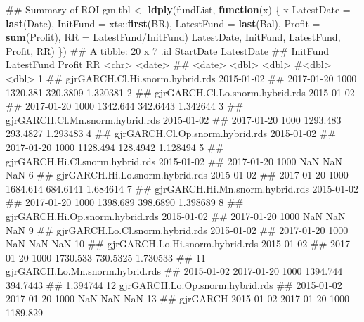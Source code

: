 \documentclass[]{tufte-book}
\newenvironment{Shaded}{}{}
\newcommand{\KeywordTok}[1]{\textcolor[rgb]{0.00,0.44,0.13}{\textbf{#1}}}
\newcommand{\DataTypeTok}[1]{\textcolor[rgb]{0.56,0.13,0.00}{#1}}
\newcommand{\StringTok}[1]{\textcolor[rgb]{0.25,0.44,0.63}{#1}}
\newcommand{\ControlFlowTok}[1]{\textcolor[rgb]{0.00,0.44,0.13}{\textbf{#1}}}
\newcommand{\OperatorTok}[1]{\textcolor[rgb]{0.40,0.40,0.40}{#1}}
\newcommand{\NormalTok}[1]{#1}
\begin{document}
\begin{Shaded}
\begin{Highlighting}[]
{{\NormalTok{## Summary of ROI}
\NormalTok{gm.tbl <-}\StringTok{ }\KeywordTok{ldply}\NormalTok{(fundList, }\ControlFlowTok{function}\NormalTok{(x) \{}
\NormalTok{    x }\OperatorTok{%
        \DataTypeTok{LatestDate =} \KeywordTok{last}\NormalTok{(Date), }\DataTypeTok{InitFund =}\NormalTok{ xts}\OperatorTok{::}\KeywordTok{first}\NormalTok{(BR), }
        \DataTypeTok{LatestFund =} \KeywordTok{last}\NormalTok{(Bal), }\DataTypeTok{Profit =} \KeywordTok{sum}\NormalTok{(Profit), }
        \DataTypeTok{RR =}\NormalTok{ LatestFund}\OperatorTok{/}\NormalTok{InitFund) }\OperatorTok{%
\NormalTok{        LatestDate, InitFund, LatestFund, Profit, }
\NormalTok{        RR) }\OperatorTok{%
\NormalTok{\}) }\OperatorTok{%
\NormalTok{## A tibble: 20 x 7 .id StartDate LatestDate}
\NormalTok{## InitFund LatestFund Profit RR <chr> <date>}
\NormalTok{## <date> <dbl> <dbl> #<dbl> <dbl> 1}
\NormalTok{## gjrGARCH.Cl.Hi.snorm.hybrid.rds 2015-01-02}
\NormalTok{## 2017-01-20 1000 1320.381 320.3809 1.320381 2}
\NormalTok{## gjrGARCH.Cl.Lo.snorm.hybrid.rds 2015-01-02}
\NormalTok{## 2017-01-20 1000 1342.644 342.6443 1.342644 3}
\NormalTok{## gjrGARCH.Cl.Mn.snorm.hybrid.rds 2015-01-02}
\NormalTok{## 2017-01-20 1000 1293.483 293.4827 1.293483 4}
\NormalTok{## gjrGARCH.Cl.Op.snorm.hybrid.rds 2015-01-02}
\NormalTok{## 2017-01-20 1000 1128.494 128.4942 1.128494 5}
\NormalTok{## gjrGARCH.Hi.Cl.snorm.hybrid.rds 2015-01-02}
\NormalTok{## 2017-01-20 1000 NaN NaN NaN 6}
\NormalTok{## gjrGARCH.Hi.Lo.snorm.hybrid.rds 2015-01-02}
\NormalTok{## 2017-01-20 1000 1684.614 684.6141 1.684614 7}
\NormalTok{## gjrGARCH.Hi.Mn.snorm.hybrid.rds 2015-01-02}
\NormalTok{## 2017-01-20 1000 1398.689 398.6890 1.398689 8}
\NormalTok{## gjrGARCH.Hi.Op.snorm.hybrid.rds 2015-01-02}
\NormalTok{## 2017-01-20 1000 NaN NaN NaN 9}
\NormalTok{## gjrGARCH.Lo.Cl.snorm.hybrid.rds 2015-01-02}
\NormalTok{## 2017-01-20 1000 NaN NaN NaN 10}
\NormalTok{## gjrGARCH.Lo.Hi.snorm.hybrid.rds 2015-01-02}
\NormalTok{## 2017-01-20 1000 1730.533 730.5325 1.730533}
\NormalTok{## 11 gjrGARCH.Lo.Mn.snorm.hybrid.rds}
\NormalTok{## 2015-01-02 2017-01-20 1000 1394.744 394.7443}
\NormalTok{## 1.394744 12 gjrGARCH.Lo.Op.snorm.hybrid.rds}
\NormalTok{## 2015-01-02 2017-01-20 1000 NaN NaN NaN 13}
\NormalTok{## gjrGARCH 2015-01-02 2017-01-20 1000 1189.829}
}}}}}}
\end{Highlighting}
\end{Shaded}
\end{document}

